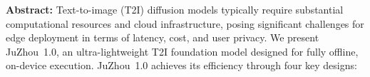 \documentclass[11pt,a4paper]{article}
\begin{document}
\begin{center}
\begin{tcolorbox}[colback=gray!10, colframe=white, arc=5pt, boxrule=0pt, left=6pt, right=6pt, top=8pt, bottom=8pt, width=\textwidth]
\noindent
\textbf{Abstract:}
Text-to-image (T2I) diffusion models typically require substantial computational resources and cloud infrastructure, posing significant challenges for edge deployment in terms of latency, cost, and user privacy. We present JuZhou~1.0, an ultra-lightweight T2I foundation model designed for fully offline, on-device execution. JuZhou~1.0 achieves its efficiency through four key designs:

\end{tcolorbox}
\end{center}
\end{document}
